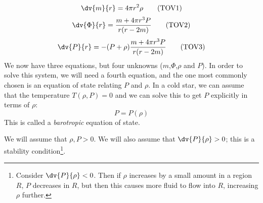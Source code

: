 \documentclass{jknotes}
\begin{document}
\begin{equation}
    \dv{m}{r} = 4\pi r^2\rho
    \tag{TOV1}
    \label{TOV1}
\end{equation}
\begin{equation}
    \dv{\Phi}{r} = \frac{m+4\pi r^3P}{r(r-2m)}
    \tag{TOV2}
    \label{TOV2}
\end{equation}
\begin{equation}
    \dv{P}{r} = - (P+\rho) \frac{m+4\pi r^3P}{r(r-2m)}
    \tag{TOV3}
    \label{TOV3}
\end{equation}
We now have three equations, but four unknowns (\(m\),\(\Phi\),\(\rho\) and \(P\)). In order to solve this system, we will need a fourth equation, and the one most commonly chosen is an equation of state relating \(P\) and \(\rho\). In a cold star, we can assume that the temperature \(T(\rho,P)=0\) and we can solve this to get \(P\) explicitly in terms of \(\rho\):
\begin{equation}
    P = P(\rho)
\end{equation}
This is called a \emph{barotropic} equation of state.

We will assume that \(\rho,P>0\). We will also assume that \(\dv{P}{\rho}>0\); this is a stability condition\footnote{Consider \(\dv{P}{\rho}<0\). Then if \(\rho\) increases by a small amount in a region \(R\), \(P\) decreases in \(R\), but then this causes more fluid to flow into \(R\), increasing \(\rho\) further.}. 
\end{document}
